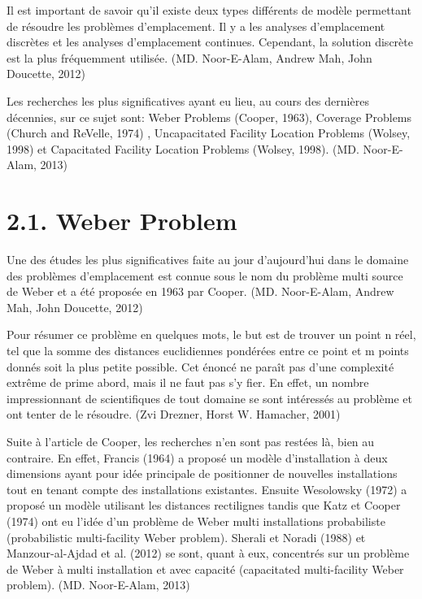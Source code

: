 Il est important de savoir qu'il existe deux types différents de modèle permettant de résoudre les problèmes d'emplacement. Il y a les analyses d'emplacement discrètes et les analyses d'emplacement continues. Cependant, la solution discrète est la plus fréquemment utilisée. (MD. Noor-E-Alam, Andrew Mah, John Doucette, 2012)

\bigskip

Les recherches les plus significatives ayant eu lieu, au cours des dernières décennies, sur ce sujet sont: Weber Problems (Cooper, 1963), Coverage Problems (Church and ReVelle, 1974) , Uncapacitated Facility Location Problems (Wolsey, 1998) et Capacitated Facility Location Problems (Wolsey, 1998). (MD. Noor-E-Alam, 2013)


\section*{2.1. Weber Problem}

\bigskip

Une des études les plus significatives faite au jour d'aujourd'hui dans le domaine des problèmes d'emplacement est connue sous le nom du problème multi source de Weber et a été proposée en 1963 par Cooper. (MD. Noor-E-Alam, Andrew Mah, John Doucette, 2012)

\bigskip

Pour résumer ce problème en quelques mots, le but est de trouver un point n réel, tel que la somme des distances euclidiennes pondérées entre ce point et m points donnés soit la plus petite possible. Cet énoncé ne paraît pas d'une complexité extrême de prime abord, mais il ne faut pas s'y fier. En effet, un nombre impressionnant de scientifiques de tout domaine se sont intéressés au problème et ont tenter de le résoudre. (Zvi Drezner, Horst W. Hamacher, 2001)

\bigskip

Suite à l'article de Cooper, les recherches n'en sont pas restées là, bien au contraire. En effet, Francis (1964) a proposé un modèle d'installation à deux dimensions ayant pour idée principale de positionner de nouvelles installations tout en tenant compte des installations existantes. Ensuite Wesolowsky (1972) a proposé un modèle utilisant les distances rectilignes tandis que Katz et Cooper (1974) ont eu l'idée d'un problème de Weber multi installations probabiliste (probabilistic multi-facility Weber problem). Sherali et Noradi (1988) et Manzour-al-Ajdad et al. (2012) se sont, quant à eux, concentrés sur un problème de Weber à multi installation et avec capacité (capacitated multi-facility Weber problem). (MD. Noor-E-Alam, 2013)

